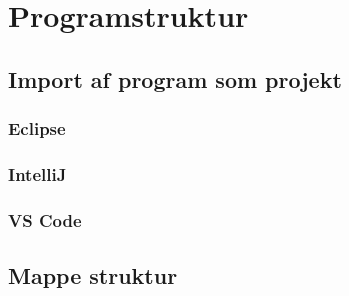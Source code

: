 \section{Programstruktur}
\subsection{Import af program som projekt}
\subsubsection{Eclipse}
\subsubsection{IntelliJ}
\subsubsection{VS Code}
\subsection{Mappe struktur}